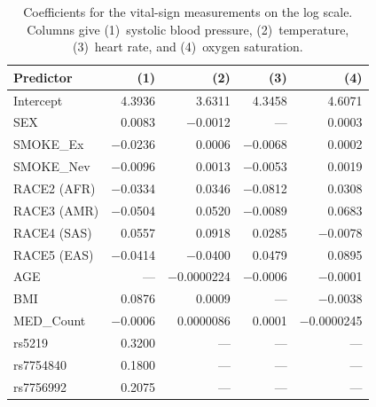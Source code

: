 \begin{table}[ht]
\centering
\caption{Coefficients for the vital-sign measurements on the log scale. Columns give (1)~systolic blood pressure, (2)~temperature, (3)~heart rate, and (4)~oxygen saturation.}
\label{tab:app_coef_vitals}
\small
\begin{tabular}{lrrrr}
\hline
\textbf{Predictor} & \textbf{(1)} & \textbf{(2)} & \textbf{(3)} & \textbf{(4)} \\
\hline
Intercept    &  4.3936 &  3.6311 &  4.3458 &  4.6071 \\
SEX          &  0.0083 & $-$0.0012 &     --- &  0.0003 \\
SMOKE\_Ex    & $-$0.0236 &  0.0006 & $-$0.0068 &  0.0002 \\
SMOKE\_Nev   & $-$0.0096 &  0.0013 & $-$0.0053 &  0.0019 \\
RACE2 (AFR)  & $-$0.0334 &  0.0346 & $-$0.0812 &  0.0308 \\
RACE3 (AMR)  & $-$0.0504 &  0.0520 & $-$0.0089 &  0.0683 \\
RACE4 (SAS)  &  0.0557 &  0.0918 &  0.0285 & $-$0.0078 \\
RACE5 (EAS)  & $-$0.0414 & $-$0.0400 &  0.0479 &  0.0895 \\
AGE          &     --- & $-$0.0000224 & $-$0.0006 & $-$0.0001 \\
BMI          &  0.0876 &  0.0009 &     --- & $-$0.0038 \\
MED\_Count   & $-$0.0006 &  0.0000086 &  0.0001 & $-$0.0000245 \\
rs5219       &  0.3200 &     --- &     --- &     --- \\
rs7754840    &  0.1800 &     --- &     --- &     --- \\
rs7756992    &  0.2075 &     --- &     --- &     --- \\
\hline
\end{tabular}
\end{table}

